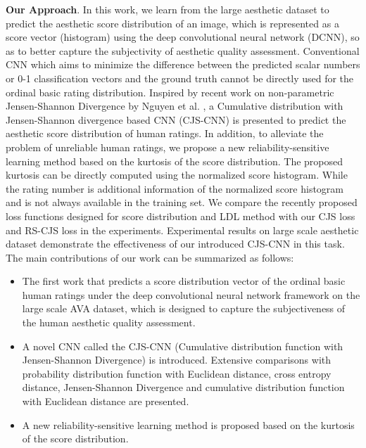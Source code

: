 \documentclass[letterpaper]{article} %
\begin{document}
\textbf{Our Approach}. In this work, we learn from the large aesthetic dataset to predict the aesthetic score distribution of an image, which is represented as a score vector (histogram) using the deep convolutional neural network (DCNN), so as to better capture the subjectivity of aesthetic quality assessment. Conventional CNN which aims to minimize the difference between the predicted scalar numbers or 0-1 classification vectors and the ground truth cannot be directly used for the ordinal basic rating distribution. Inspired by recent work on non-parametric Jensen-Shannon Divergence by Nguyen et al. \cite{NguyenECML2015}, a Cumulative distribution with Jensen-Shannon divergence based CNN (CJS-CNN) is presented to predict the aesthetic score distribution of human ratings. In addition, to alleviate the problem of unreliable human ratings, we propose a new reliability-sensitive learning method based on the kurtosis of the score distribution. The proposed kurtosis can be directly computed using the normalized score histogram. While the rating number is additional information of the normalized score histogram and is not always available in the training set. We compare the recently proposed loss functions designed for score distribution and LDL method with our CJS loss and RS-CJS loss in the experiments. Experimental results on large scale aesthetic dataset demonstrate the effectiveness of our introduced CJS-CNN in this task. The main contributions of our work can be summarized as follows:


\begin{itemize}

\item The first work that predicts a score distribution vector of the ordinal basic human ratings under the deep convolutional neural network framework on the large scale AVA dataset, which is designed to capture the subjectiveness of the human aesthetic quality assessment. 

\item A novel CNN called the CJS-CNN (Cumulative distribution function with Jensen-Shannon Divergence) is introduced. Extensive comparisons with probability distribution function with Euclidean distance, cross entropy distance, Jensen-Shannon Divergence and cumulative distribution function with Euclidean distance are presented.

\item A new reliability-sensitive learning method is proposed based on the kurtosis of the score distribution.



\end{itemize}
\end{document}
